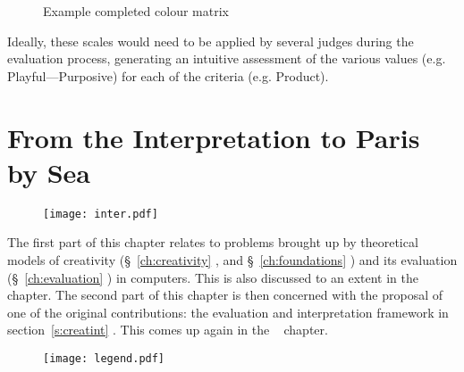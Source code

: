 \begin{figure}[!htbp]
\caption[Example completed colour matrix]{Example completed colour matrix}
\label{fig:excmatrix}
\end{figure}

Ideally, these scales would need to be applied by several judges during the evaluation process, generating an intuitive assessment of the various values (e.g. Playful---Purposive) for each of the criteria (e.g. Product).

\newpage
\section{From the Interpretation to Paris by Sea}

\begin{figure}[!htb]
\centering
  \texttt{[image: inter.pdf]}
\end{figure}

The first part of this chapter relates to problems brought up by theoretical models of creativity (§~\ref{ch:creativity} \creat, and §~\ref{ch:foundations} \found) and its evaluation (§~\ref{ch:evaluation} \eval) in computers. This is also discussed to an extent in the  \anal~ chapter. The second part of this chapter is then concerned with the proposal of one of the original contributions: the evaluation and interpretation framework in section~\ref{s:creatint} \inter. This comes up again in the  \aspi~ chapter.

\begin{figure}[!htb]
\centering
  \texttt{[image: legend.pdf]}
\end{figure}

\stopcontents[chapters]
